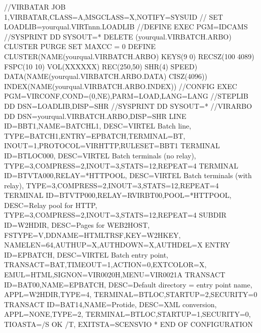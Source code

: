 \documentclass[letterpaper,10pt,english]{sphinxmanual}
\begin{document}
\begin{sphinxVerbatim}[commandchars=\\\{\}]
//VIRBATAR JOB 1,VIRBATAR,CLASS=A,MSGCLASS=X,NOTIFY=\PYGZam{}SYSUID
// SET LOADLIB=yourqual.VIRTnnn.LOADLIB
//DEFINE EXEC PGM=IDCAMS
//SYSPRINT DD SYSOUT=*
    DELETE (yourqual.VIRBATCH.ARBO) CLUSTER PURGE
    SET MAXCC = 0
    DEFINE CLUSTER(NAME(yourqual.VIRBATCH.ARBO) \PYGZhy{}
        KEYS(9 0) RECSZ(100 4089) FSPC(10 10) \PYGZhy{}
        VOL(XXXXXX) REC(250,50) SHR(4) SPEED) \PYGZhy{}
    DATA(NAME(yourqual.VIRBATCH.ARBO.DATA) CISZ(4096)) \PYGZhy{}
    INDEX(NAME(yourqual.VIRBATCH.ARBO.INDEX))
//CONFIG EXEC PGM=VIRCONF,COND=(0,NE),PARM=\PYGZsq{}LOAD,LANG=\PYGZam{}LANG\PYGZsq{}
//STEPLIB DD DSN=\PYGZam{}LOADLIB,DISP=SHR
//SYSPRINT DD SYSOUT=*
//VIRARBO DD DSN=yourqual.VIRBATCH.ARBO,DISP=SHR
    LINE ID=B\PYGZhy{}BT1,NAME=BATCH\PYGZhy{}L1,
        DESC=\PYGZsq{}VIRTEL Batch line\PYGZsq{},
        TYPE=BATCH1,ENTRY=EPBATCH,TERMINAL=BT,
        INOUT=1,PROTOCOL=VIRHTTP,RULESET=B\PYGZhy{}BT1
    TERMINAL ID=BTLOC000,
        DESC=\PYGZsq{}VIRTEL Batch terminals (no relay)\PYGZsq{},
        TYPE=3,COMPRESS=2,INOUT=3,STATS=12,REPEAT=4
    TERMINAL ID=BTVTA000,RELAY=*HTTPOOL,
        DESC=\PYGZsq{}VIRTEL Batch terminals (with relay)\PYGZsq{},
        TYPE=3,COMPRESS=2,INOUT=3,STATS=12,REPEAT=4
    TERMINAL ID=BTVTP000,RELAY=RVIRBT00,POOL=*HTTPOOL,
        DESC=\PYGZsq{}Relay pool for HTTP\PYGZsq{},
        TYPE=3,COMPRESS=2,INOUT=3,STATS=12,REPEAT=4
    SUBDIR ID=W2H\PYGZhy{}DIR,
        DESC=\PYGZsq{}Pages for WEB2HOST\PYGZsq{},
        FSTYPE=V,DDNAME=HTMLTRSF,KEY=W2H\PYGZhy{}KEY,
        NAMELEN=64,AUTHUP=X,AUTHDOWN=X,AUTHDEL=X
    ENTRY ID=EPBATCH,
        DESC=\PYGZsq{}VIRTEL Batch entry point\PYGZsq{},
        TRANSACT=BAT,TIMEOUT=1,ACTION=0,EXTCOLOR=X,
        EMUL=HTML,SIGNON=VIR0020H,MENU=VIR0021A
    TRANSACT ID=BAT\PYGZhy{}00,NAME=EPBATCH,
         DESC=\PYGZsq{}Default directory = entry point name\PYGZsq{},
        APPL=W2H\PYGZhy{}DIR,TYPE=4,
        TERMINAL=BTLOC,STARTUP=2,SECURITY=0
    TRANSACT ID=BAT\PYGZhy{}14,NAME=\PYGZsq{}Protide\PYGZsq{},
        DESC=\PYGZsq{}XML conversion\PYGZsq{},
        APPL=\PYGZdl{}NONE\PYGZdl{},TYPE=2,
        TERMINAL=BTLOC,STARTUP=1,SECURITY=0,
        TIOASTA=\PYGZsq{}\PYGZam{}/S OK \PYGZam{}/T\PYGZsq{},
        EXITSTA=SCENSVIO
* END OF CONFIGURATION
\end{sphinxVerbatim}


\end{document}
